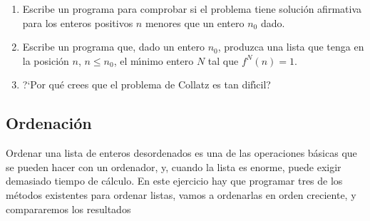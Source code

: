 \begin{ejer}
\begin{enumerate}

\item Escribe un programa para comprobar si  el problema tiene soluci\'on
afirmativa  para los enteros positivos $n$ menores que un entero $n_0$ dado. 

\item Escribe un programa que, dado un entero $n_0$,  produzca una lista que
tenga en la posici\'on $n$, $n\le n_0$,  el m\'{\i}nimo entero $N$ tal que
$f^N(n)=1.$

\item ?`Por qu\'e crees que el problema de Collatz es tan dif\'{\i}cil?

 
 \end{enumerate}
 \end{ejer}

\subsection{Ordenaci\'on}\label{ordenacion}
Ordenar una lista de enteros desordenados es una de las operaciones b\'asicas
que se pueden hacer con un ordenador, y, cuando la lista es enorme, puede exigir
demasiado tiempo de c\'alculo. En este ejercicio hay que programar tres de
los m\'etodos existentes para ordenar listas, vamos a ordenarlas en orden
creciente, y compararemos los resultados




